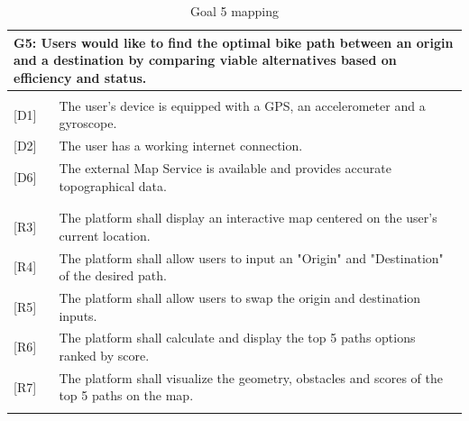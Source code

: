 \newpage
\begin{table}[H]
    \centering
    \renewcommand{\arraystretch}{1.5}
    
    \begin{tabularx}{\textwidth}{|l X|}
        \hline
        \multicolumn{2}{|p{\dimexpr\textwidth-2\tabcolsep}|}{\textbf{G5}: Users would like to find the optimal bike path between an origin and a destination by comparing viable alternatives based on efficiency and status.} \\
        \hline
        & \\[-1em] %
        
        
        {[D1]} &  The user’s device is equipped with a GPS, an accelerometer and a gyroscope. \\
        {[D2]} & The user has a working internet connection. \\
        {[D6]} & The external Map Service is available and provides accurate topographical data.\\
        & \\
        \hline
        & \\[-1em]
        
        {[R3]} & The platform shall display an interactive map centered on the user’s current location. \\
        {[R4]} &  The platform shall allow users to input an "Origin" and "Destination" of the desired path. \\ 
        {[R5]} &  The platform shall allow users to swap the origin and destination inputs.\\ 
        {[R6]} &  The platform shall calculate and display the top 5 paths options ranked by score. \\ 
        {[R7]} &  The platform shall visualize the geometry, obstacles and scores of the top 5 paths on the map.\\ 
        
        & \\
        \hline
    \end{tabularx}
    \caption{Goal 5 mapping}
\end{table}



